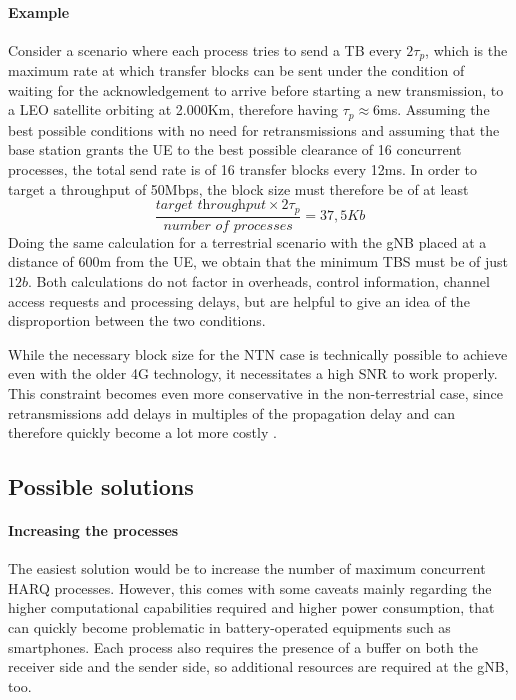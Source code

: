 \paragraph{Example} Consider a scenario where each process tries to send a \ac{TB} every $2\tau_p$, which is the maximum rate at which transfer blocks can be sent under the condition of waiting for the acknowledgement to arrive before starting a new transmission, to a \ac{LEO} satellite orbiting at 2.000Km, therefore having $\tau_p\approx6$ms. Assuming the best possible conditions with no need for retransmissions and assuming that the base station grants the \ac{UE} to the best possible clearance of 16 concurrent processes, the total send rate is of 16 transfer blocks every 12ms. In order to target a throughput of 50Mbps, the block size must therefore be of at least $$\frac{\textit{target throughput} \times 2\tau_p}{\textit{number of processes}} = 37,5Kb$$
Doing the same calculation for a terrestrial scenario with the \ac{gNB} placed at a distance of 600m from the \ac{UE}, we obtain that the minimum \ac{TBS} must be of just $12b$.
Both calculations do not factor in overheads, control information, channel access requests and processing delays, but are helpful to give an idea of the disproportion between the two conditions.

While the necessary block size for the \ac{NTN} case is technically possible to achieve even with the older 4G technology, it necessitates a high \ac{SNR} to work properly. This constraint becomes even more conservative in the non-terrestrial case, since retransmissions add delays in multiples of the propagation delay and can therefore quickly become a lot more costly \cite{4g-phy-processing-sharetechnote}.

\subsection{Possible solutions}
\label{sec:proc-harq-prop-sol}
\paragraph{Increasing the processes}
The easiest solution would be to increase the number of maximum concurrent \ac{HARQ} processes. However, this comes with some caveats mainly regarding the higher computational capabilities required and higher power consumption, that can quickly become problematic in battery-operated equipments such as smartphones. Each process also requires the presence of a buffer on both the receiver side and the sender side, so additional resources are required at the \ac{gNB}, too. 
